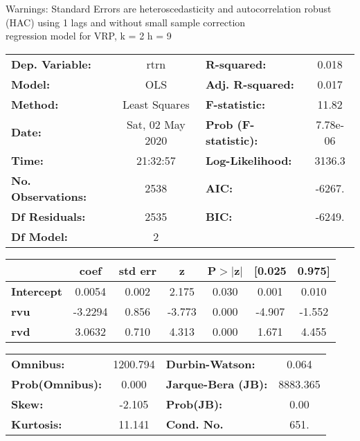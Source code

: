 Warnings: \newline
 [1] Standard Errors are heteroscedasticity and autocorrelation robust (HAC) using 1 lags and without small sample correction\\ 

regression model for VRP, k = 2 h = 9\begin{center}
\begin{tabular}{lclc}
\toprule
\textbf{Dep. Variable:}    &       rtrn       & \textbf{  R-squared:         } &     0.018   \\
\textbf{Model:}            &       OLS        & \textbf{  Adj. R-squared:    } &     0.017   \\
\textbf{Method:}           &  Least Squares   & \textbf{  F-statistic:       } &     11.82   \\
\textbf{Date:}             & Sat, 02 May 2020 & \textbf{  Prob (F-statistic):} &  7.78e-06   \\
\textbf{Time:}             &     21:32:57     & \textbf{  Log-Likelihood:    } &    3136.3   \\
\textbf{No. Observations:} &        2538      & \textbf{  AIC:               } &    -6267.   \\
\textbf{Df Residuals:}     &        2535      & \textbf{  BIC:               } &    -6249.   \\
\textbf{Df Model:}         &           2      & \textbf{                     } &             \\
\bottomrule
\end{tabular}
\begin{tabular}{lcccccc}
                   & \textbf{coef} & \textbf{std err} & \textbf{z} & \textbf{P$> |$z$|$} & \textbf{[0.025} & \textbf{0.975]}  \\
\midrule
\textbf{Intercept} &       0.0054  &        0.002     &     2.175  &         0.030        &        0.001    &        0.010     \\
\textbf{rvu}       &      -3.2294  &        0.856     &    -3.773  &         0.000        &       -4.907    &       -1.552     \\
\textbf{rvd}       &       3.0632  &        0.710     &     4.313  &         0.000        &        1.671    &        4.455     \\
\bottomrule
\end{tabular}
\begin{tabular}{lclc}
\textbf{Omnibus:}       & 1200.794 & \textbf{  Durbin-Watson:     } &    0.064  \\
\textbf{Prob(Omnibus):} &   0.000  & \textbf{  Jarque-Bera (JB):  } & 8883.365  \\
\textbf{Skew:}          &  -2.105  & \textbf{  Prob(JB):          } &     0.00  \\
\textbf{Kurtosis:}      &  11.141  & \textbf{  Cond. No.          } &     651.  \\
\bottomrule
\end{tabular}
\end{center}

